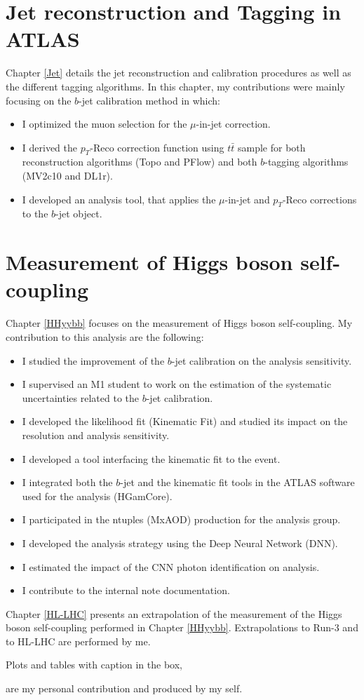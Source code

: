 \section*{Jet reconstruction and Tagging in ATLAS}
Chapter \ref{Jet} details the jet reconstruction and calibration procedures as well as the different tagging algorithms. In this chapter, my contributions were mainly focusing on the $b$-jet calibration method in which: 
\begin{itemize}
    \item I optimized the muon selection for the $\mu$-in-jet correction.
    \item I derived the $p_T$-Reco correction function using $t\bar{t}$ sample for both reconstruction algorithms (Topo and PFlow) and both $b$-tagging algorithms (MV2c10 and DL1r). 
    \item I developed an analysis tool, that applies the $\mu$-in-jet and $p_T$-Reco corrections to the $b$-jet object.
\end{itemize}

\section*{Measurement of Higgs boson self-coupling}

Chapter \ref{HHyybb} focuses on the measurement of Higgs boson self-coupling. My contribution to this analysis are the following: 

\begin{itemize}
    \item I studied the improvement of the $b$-jet calibration on the analysis sensitivity.  
    \item I supervised an M1 student to work on the estimation of the systematic uncertainties related to the $b$-jet calibration. 
    \item I developed the likelihood fit (Kinematic Fit) and studied its impact on the \mbb resolution and analysis sensitivity. 
    \item I developed a tool interfacing the kinematic fit to the \bbyy event.
    \item I integrated both the $b$-jet and the kinematic fit tools in the ATLAS software used for the analysis (HGamCore).
    \item I participated in the ntuples (MxAOD) production for the analysis group.
    \item I developed the analysis strategy using the Deep Neural Network (DNN).
    \item I estimated the impact of the CNN photon identification on \HHyybb analysis.
    \item I contribute to the internal note documentation.
\end{itemize}

Chapter \ref{HL-LHC} presents an extrapolation of the measurement of the Higgs boson self-coupling performed in Chapter \ref{HHyybb}. Extrapolations to Run-3 and to HL-LHC are performed by me.

Plots and tables with caption in the box,
\begin{tcolorbox}[colback=black!5!white,colframe=white!75!black]
\end{tcolorbox}
are my personal contribution and produced by my self.